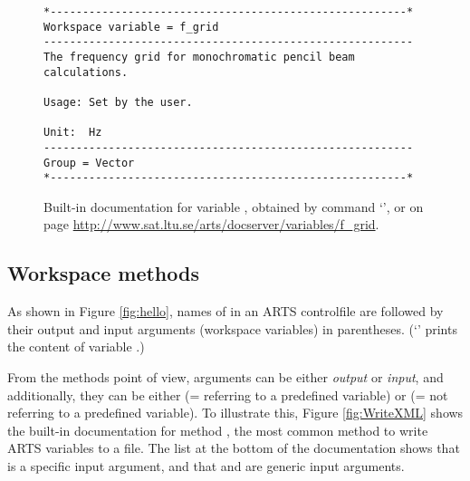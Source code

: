 \begin{figure}
\footnotesize
\begin{lstlisting}
*-------------------------------------------------------*
Workspace variable = f_grid
---------------------------------------------------------
The frequency grid for monochromatic pencil beam 
calculations.

Usage: Set by the user.
 
Unit:  Hz
---------------------------------------------------------
Group = Vector
*-------------------------------------------------------*
\end{lstlisting}
\caption{Built-in documentation for variable , obtained by
  command `', or on page
  \url{http://www.sat.ltu.se/arts/docserver/variables/f_grid}.} 
\label{fig:f_grid}
\end{figure}

\subsection{Workspace methods}
%
As shown in Figure \ref{fig:hello}, names of  in an ARTS
controlfile are followed by their output and input arguments (workspace
variables) in parentheses. (`' prints the content of variable
.)

From the methods point of view, arguments can be either \emph{output}
or \emph{input}, and additionally, they can be either
\emph{} (= referring to a predefined variable) or
\emph{} (= not referring to a predefined
variable). To illustrate this, Figure \ref{fig:WriteXML} shows the
built-in documentation for method , the most
common method to write ARTS variables to a file. The list at the
bottom of the documentation shows that
 is a specific input argument, and
that  and  are generic input
arguments.

